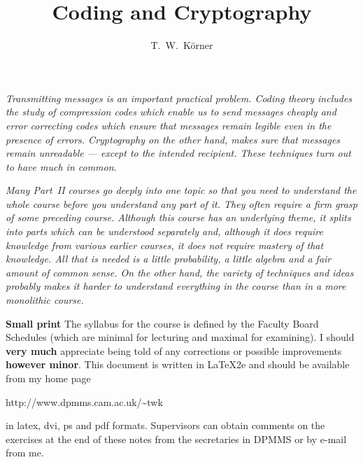 \documentclass[12pt,a4paper]{article}
\theoremstyle{plain}
\theoremstyle{definition}
\begin{document}
    \title{Coding and Cryptography}
    \author{T.~W.~K\"{o}rner}
    \maketitle
    \emph{Transmitting messages is an important
    practical problem. Coding theory includes the
    study of compression codes which enable
    us to send messages cheaply and error correcting codes
    which ensure
    that messages remain legible even in the
    presence of errors. Cryptography on the other
    hand, makes sure that messages remain unreadable --- except
    to the intended recipient. These
    techniques turn out to have much in common.}

    \emph{Many Part~II courses go deeply into one topic so that
    you need to understand the whole course before you understand
    any part of it. They often require a firm grasp
    of some preceding course. Although this course has an underlying
    theme, it splits into parts which can be understood separately
    and, although it does require knowledge from various earlier
    courses, it does not require mastery of that knowledge.
    All that is needed is a little probability, a little
    algebra and a fair amount of common sense. On the other hand,
    the variety of techniques and ideas probably makes
    it harder to understand \emph{everything} in the course
    than in a more monolithic course.}

    \vspace{1\baselineskip}

    \begin{footnotesize}
        \noindent
        {\bf Small print}
        The syllabus for the course is defined by
        the Faculty Board Schedules (which are minimal for lecturing
        and maximal for examining).
        I should {\bf very much} appreciate being told
        of any corrections or possible improvements
        {\bf however minor}.
        This document
        is written in \LaTeX2e and should be available from my
        home page
        \begin{center}
        {\sf http://www.dpmms.cam.ac.uk/\textasciitilde twk}
        \end{center}
        in latex, dvi, ps and pdf formats.
        Supervisors can obtain
        comments on the exercises at the end of these notes
        from the secretaries in DPMMS or by e-mail from me.
    \end{footnotesize}
\end{document}
